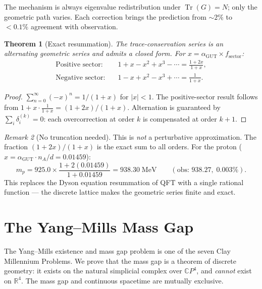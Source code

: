 \documentclass[12pt]{article}
\newtheorem{theorem}{Theorem}[section]
\theoremstyle{remark}
\newtheorem{remark}[theorem]{Remark}
\theoremstyle{definition}
\newcommand{\CP}{\mathbb{C}P}
\newcommand{\RR}{\mathbb{R}}
\newcommand{\agut}{\alpha_{\mathrm{GUT}}}
\begin{document}
The mechanism is always eigenvalue redistribution under $\operatorname{Tr}(G) = N$; only the geometric path varies.  Each correction brings the prediction from $\sim\!2\%$ to $<\!0.1\%$ agreement with observation.

\begin{theorem}[Exact resummation]
\label{thm:resummation}
The trace-conservation series is an alternating geometric series and admits a closed form.  For $x = \agut \times f_\mathrm{sector}$:
\begin{align}
\text{Positive sector:}&\quad 1 + x - x^2 + x^3 - \cdots = \frac{1 + 2x}{1 + x}, \\
\text{Negative sector:}&\quad 1 - x + x^2 - x^3 + \cdots = \frac{1}{1 + x}.
\end{align}
\end{theorem}

\begin{proof}
$\sum_{n=0}^{\infty}(-x)^n = 1/(1+x)$ for $|x| < 1$.  The positive-sector result follows from $1 + x \cdot \tfrac{1}{1+x} = (1+2x)/(1+x)$.  Alternation is guaranteed by $\sum_i \delta^{(k)}_i = 0$: each overcorrection at order $k$ is compensated at order $k+1$.
\end{proof}

\begin{remark}[No truncation needed]
This is \emph{not} a perturbative approximation.  The fraction $(1+2x)/(1+x)$ is the exact sum to all orders.  For the proton ($x = \agut \cdot n_A/d = 0.01459$):
\begin{equation}
m_p = 925.0 \times \frac{1 + 2(0.01459)}{1 + 0.01459} = 938.30\;\text{MeV}
\qquad (\text{obs: } 938.27,\; 0.003\%).
\end{equation}
This replaces the Dyson equation resummation of QFT with a single rational function --- the discrete lattice makes the geometric series finite and exact.
\end{remark}

\section{The Yang--Mills Mass Gap}
\label{ch:yang_mills}

The Yang--Mills existence and mass gap problem is one of the seven Clay Millennium Problems. We prove that the mass gap is a theorem of discrete geometry: it exists on the natural simplicial complex over $\CP^4$, and \emph{cannot} exist on $\RR^4$. The mass gap and continuous spacetime are mutually exclusive.
\end{document}
